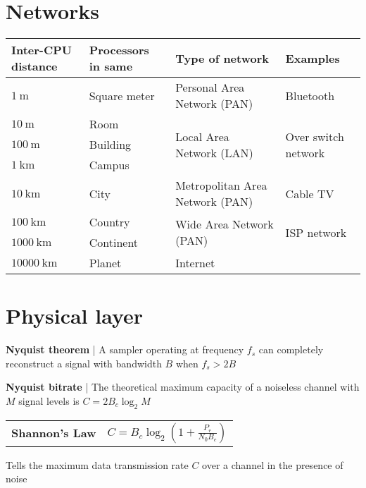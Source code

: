 \documentclass{form}
\begin{document}
\noindent%
\begin{minipage}{0.64\textwidth}
    \section*{Networks}
    \begin{tabular}{@{}p{19mm} | p{21mm} | l | p{19mm}@{}}
        \textbf{Inter-CPU distance} & \textbf{Processors in same} & \textbf{Type of network} & \textbf{Examples} \\ \hline
        $\SI{    1}{     \meter}$ & Square meter & Personal Area Network (PAN)               & Bluetooth \\ \hline
        $\SI{   10}{     \meter}$ & Room         & \multirow{3}{*}{Local Area Network (LAN)} & \multirow{3}{19mm}{Over switch network} \\ \cline{1-2}
        $\SI{  100}{     \meter}$ & Building     &                                           & \\ \cline{1-2}
        $\SI{    1}{\kilo\meter}$ & Campus       &                                           & \\ \hline
        $\SI{   10}{\kilo\meter}$ & City         & Metropolitan Area Network (PAN)           & Cable TV \\ \hline
        $\SI{  100}{\kilo\meter}$ & Country      & \multirow{2}{*}{Wide Area Network (PAN)}  & \multirow{2}{*}{ISP network} \\ \cline{1-2}
        $\SI{ 1000}{\kilo\meter}$ & Continent    &                                           & \\ \hline
        $\SI{10000}{\kilo\meter}$ & Planet       & Internet                                  & \\
    \end{tabular}
\end{minipage}%
\begin{minipage}{0.36\textwidth}
    \section*{Physical layer}
    \textbf{Nyquist theorem} | 
    A sampler operating at frequency $f_s$ can completely reconstruct a signal with bandwidth $B$ when
    $f_s > 2B$
    
    \vspace{0.5em}

    \textbf{Nyquist bitrate} | 
    The theoretical maximum capacity of a noiseless channel with $M$ signal levels is $C = 2 B_c \log_2{M}$
    
    \begin{tabular}{@{}p{27mm} p{40mm}@{}}
        \textbf{Shannon's Law} & $\displaystyle C = B_c \log_2{\left(1+\frac{P_r}{N_0 B_c}\right)}$
    \end{tabular}
    Tells the maximum data transmission rate $C$ over a channel in the presence of noise
\end{minipage}
\end{document}
